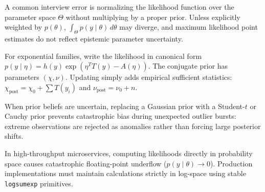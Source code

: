 
\begin{mistakebox}
A common interview error is normalizing the likelihood function over the parameter space $\Theta$ without multiplying by a proper prior. Unless explicitly weighted by $p(\theta)$, $\int_\Theta p(y \mid \theta) \, d\theta$ may diverge, and maximum likelihood point estimates do not reflect epistemic parameter uncertainty.
\end{mistakebox}

\begin{shortcutbox}
For exponential families, write the likelihood in canonical form $p(y \mid \eta) = h(y)\exp(\eta^T T(y) - A(\eta))$. The conjugate prior has parameters $(\chi, \nu)$. Updating simply adds empirical sufficient statistics: $\chi_{\text{post}} = \chi_0 + \sum T(y_i)$ and $\nu_{\text{post}} = \nu_0 + n$.
\end{shortcutbox}

\begin{variantbox}
When prior beliefs are uncertain, replacing a Gaussian prior with a Student-$t$ or Cauchy prior prevents catastrophic bias during unexpected outlier bursts: extreme observations are rejected as anomalies rather than forcing large posterior shifts.
\end{variantbox}

\begin{groundrealitybox}
In high-throughput microservices, computing likelihoods directly in probability space causes catastrophic floating-point underflow ($p(y \mid \theta) \to 0$). Production implementations must maintain calculations strictly in log-space using stable \texttt{logsumexp} primitives.
\end{groundrealitybox}

